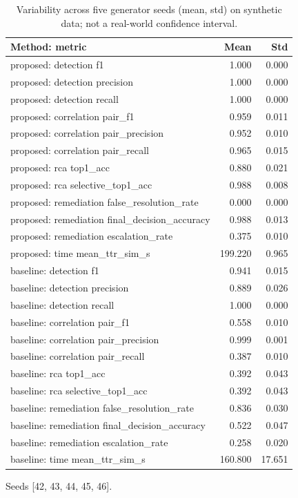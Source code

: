 \begin{table}[t]
\centering
\caption{Variability across five generator seeds (mean, std) on synthetic data; not a real-world confidence interval.}
\label{tab:seeds}
\begin{tabular}{lrr}
\toprule
Method: metric & Mean & Std \\
\midrule
proposed: detection f1 & 1.000 & 0.000 \\
proposed: detection precision & 1.000 & 0.000 \\
proposed: detection recall & 1.000 & 0.000 \\
proposed: correlation pair\_f1 & 0.959 & 0.011 \\
proposed: correlation pair\_precision & 0.952 & 0.010 \\
proposed: correlation pair\_recall & 0.965 & 0.015 \\
proposed: rca top1\_acc & 0.880 & 0.021 \\
proposed: rca selective\_top1\_acc & 0.988 & 0.008 \\
proposed: remediation false\_resolution\_rate & 0.000 & 0.000 \\
proposed: remediation final\_decision\_accuracy & 0.988 & 0.013 \\
proposed: remediation escalation\_rate & 0.375 & 0.010 \\
proposed: time mean\_ttr\_sim\_s & 199.220 & 0.965 \\
baseline: detection f1 & 0.941 & 0.015 \\
baseline: detection precision & 0.889 & 0.026 \\
baseline: detection recall & 1.000 & 0.000 \\
baseline: correlation pair\_f1 & 0.558 & 0.010 \\
baseline: correlation pair\_precision & 0.999 & 0.001 \\
baseline: correlation pair\_recall & 0.387 & 0.010 \\
baseline: rca top1\_acc & 0.392 & 0.043 \\
baseline: rca selective\_top1\_acc & 0.392 & 0.043 \\
baseline: remediation false\_resolution\_rate & 0.836 & 0.030 \\
baseline: remediation final\_decision\_accuracy & 0.522 & 0.047 \\
baseline: remediation escalation\_rate & 0.258 & 0.020 \\
baseline: time mean\_ttr\_sim\_s & 160.800 & 17.651 \\
\bottomrule
\end{tabular}
\par\footnotesize Seeds [42, 43, 44, 45, 46].
\end{table}

